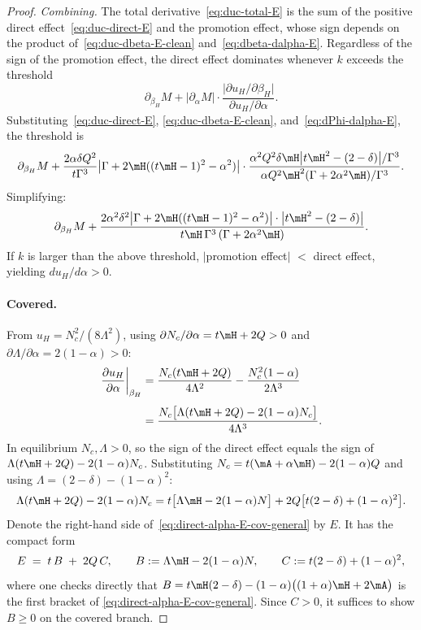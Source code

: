 \begin{proof}
\textit{Combining.}\;
The total derivative~\eqref{eq:duc-total-E} is the sum of the positive direct effect~\eqref{eq:duc-direct-E} and the promotion effect, whose sign depends on the product of~\eqref{eq:duc-dbeta-E-clean} and~\eqref{eq:dbeta-dalpha-E}.  Regardless of the sign of the promotion effect, the direct effect dominates whenever $k$ exceeds the threshold
\[
\partial_{\beta_H} M
+ \left|\partial_\alpha M\right|
\cdot\frac{\bigl|\partial u_H/\partial\beta_H\bigr|}{\partial u_H/\partial\alpha}.
\]
Substituting~\eqref{eq:duc-direct-E}, \eqref{eq:duc-dbeta-E-clean}, and~\eqref{eq:dPhi-dalpha-E}, the threshold is
\[
\partial_{\beta_H} M
+ \frac{2\alpha\delta Q^2}{t\Gamma^3}\bigl|\Gamma + 2\mH((t\mH-1)^2 - \alpha^2)\bigr|
\cdot\frac{\alpha^2 Q^2\delta\mH\bigl|t\mH^2 - (2-\delta)\bigr|/\Gamma^3}{\alpha Q^2\mH^2(\Gamma + 2\alpha^2\mH)/\Gamma^3}.
\]
Simplifying:
\begin{equation}\label{eq:kbar-alpha-E-clean}
\partial_{\beta_H} M
+ \frac{2\alpha^2\delta^2\bigl|\Gamma + 2\mH((t\mH-1)^2 - \alpha^2)\bigr|\cdot\bigl|t\mH^2 - (2-\delta)\bigr|}{t\mH\,\Gamma^3\,(\Gamma + 2\alpha^2\mH)}.
\end{equation}
If $k$ is larger than the above threshold, $|$promotion effect$|$ $<$ direct effect, yielding $du_H/d\alpha > 0$.


\paragraph{Covered.}
From $u_H = N_c^2/(8\Lambda^2)$, using $\partial N_c/\partial\alpha = t\mH + 2Q > 0$ and $\partial\Lambda/\partial\alpha = 2(1-\alpha) > 0$:
\begin{align*}
\left.\frac{\partial u_H}{\partial\alpha}\right|_{\beta_H}
&= \frac{N_c(t\mH + 2Q)}{4\Lambda^2} - \frac{N_c^2(1-\alpha)}{2\Lambda^3} \\[4pt]
&= \frac{N_c\bigl[\Lambda(t\mH + 2Q) - 2(1-\alpha)N_c\bigr]}{4\Lambda^3}.
\end{align*}
In equilibrium $N_c, \Lambda > 0$, so the sign of the direct effect equals the sign of $\Lambda(t\mH+2Q) - 2(1-\alpha)N_c$. Substituting $N_c = t(\mA+\alpha\mH) - 2(1-\alpha)Q$ and using $\Lambda = (2-\delta) - (1-\alpha)^2$:
\begin{align}
\Lambda(t\mH+2Q) - 2(1-\alpha)N_c
= t\bigl[\Lambda \mH - 2(1-\alpha)N\bigr] 
 + 2Q\bigl[t(2-\delta) + (1-\alpha)^2\bigr]. \label{eq:direct-alpha-E-cov-general}
\end{align}
Denote the right-hand side of~\eqref{eq:direct-alpha-E-cov-general} by $E$. It has the compact form
\begin{equation}\label{eq:E-split}
    E \;=\; t\,B \;+\; 2Q\,C,
    \qquad
    B := \Lambda\mH-2(1-\alpha)N,
    \qquad
    C := t(2-\delta)+(1-\alpha)^2,
\end{equation}
where one checks directly that
$B=t\mH(2-\delta)-(1-\alpha)\bigl((1+\alpha)\mH+2\mA\bigr)$ is the first bracket of
\eqref{eq:direct-alpha-E-cov-general}. Since $C>0$, it suffices to show $B\ge 0$ on the covered branch.


\end{proof}
